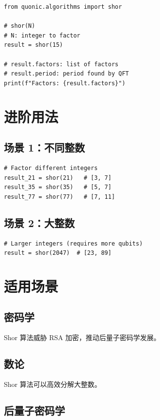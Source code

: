\documentclass[12pt,a4paper]{article}
\begin{document}
\begin{lstlisting}[style=python]
from quonic.algorithms import shor

# shor(N)
# N: integer to factor
result = shor(15)

# result.factors: list of factors
# result.period: period found by QFT
print(f"Factors: {result.factors}")
\end{lstlisting}

\section{进阶用法}

\subsection{场景 1：不同整数}

\begin{lstlisting}[style=python]
# Factor different integers
result_21 = shor(21)   # [3, 7]
result_35 = shor(35)   # [5, 7]
result_77 = shor(77)   # [7, 11]
\end{lstlisting}

\subsection{场景 2：大整数}

\begin{lstlisting}[style=python]
# Larger integers (requires more qubits)
result = shor(2047)  # [23, 89]
\end{lstlisting}

\section{适用场景}

\subsection{密码学}

Shor 算法威胁 RSA 加密，推动后量子密码学发展。

\subsection{数论}

Shor 算法可以高效分解大整数。

\subsection{后量子密码学}
\end{document}
